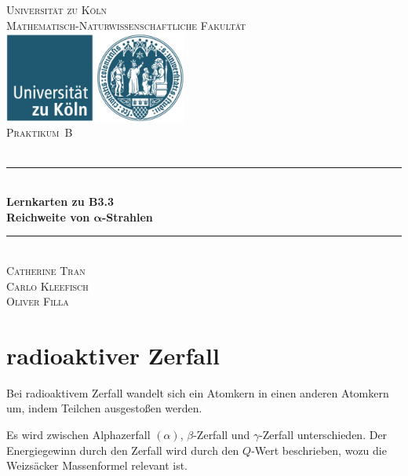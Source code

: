 \documentclass[12pt,a4paper]{scrartcl}
\numberwithin{equation}{section} %
\newcommand{\HRule}{\rule{\linewidth}{0.7mm}}
\renewcommand{\[}{} %
\renewcommand{\]}{\noindent} %
\begin{document}
\begin{titlepage}
	\pagestyle{empty}
	
	\begin{center}
		
		\textsc{\LARGE Universität zu Köln }\\ [0.4cm]
		\textsc{Mathematisch-Naturwissenschaftliche Fakultät} \\[1.5cm]
		
		\includegraphics[width=0.45\textwidth]{../media/uni.jpg}\\[1.5cm]  %
		
		\textsc{\Large Praktikum~B}\\[2mm]
		\textsc{}\\[10mm]
		\HRule \\[0.4cm]
		
		{	\Huge \bfseries Lernkarten zu B3.3}\\[0.4cm]
		{	\huge \bfseries Reichweite von $\pmb{\alpha}$-Strahlen}\\[0.3cm]
		
		\HRule \\[3cm]
		
		\textsc{\Large Catherine Tran } \\[3pt]
		\textsc{\Large Carlo Kleefisch } \\[3pt]
		\textsc{\Large Oliver Filla } \\[3pt]
	\end{center}
\end{titlepage}
\newpage
\tableofcontents
\newpage

\hypertarget{radioaktiver-zerfall}{%
\section{radioaktiver Zerfall}\label{radioaktiver-zerfall}}

Bei radioaktivem Zerfall wandelt sich ein Atomkern in einen anderen
Atomkern um, indem Teilchen ausgestoßen werden.

Es wird zwischen Alphazerfall $(\alpha)$, $\beta$-Zerfall und
$\gamma$-Zerfall unterschieden. Der Energiegewinn durch den Zerfall
wird durch den $Q$-Wert beschrieben, wozu die Weizsäcker Massenformel
relevant ist.
\end{document}
